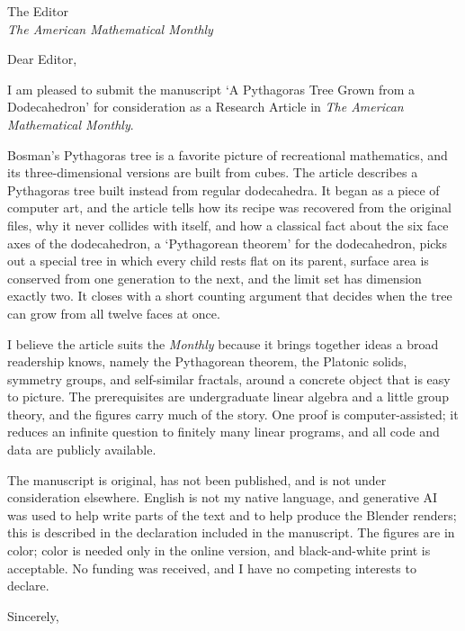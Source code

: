 \documentclass[11pt]{letter}
\date{\today}
\begin{document}
\begin{letter}{The Editor\\ \textit{The American Mathematical Monthly}}
\opening{Dear Editor,}

I am pleased to submit the manuscript `A Pythagoras Tree Grown from a
Dodecahedron' for consideration as a Research Article in \textit{The American
Mathematical Monthly}.

Bosman's Pythagoras tree is a favorite picture of recreational mathematics,
and its three-dimensional versions are built from cubes.  The article
describes a Pythagoras tree built instead from regular dodecahedra.  It began
as a piece of computer art, and the article tells how its recipe was recovered
from the original files, why it never collides with itself, and how a
classical fact about the six face axes of the dodecahedron, a `Pythagorean
theorem' for the dodecahedron, picks out a special tree in which every child
rests flat on its parent, surface area is conserved from one generation to
the next, and the limit set has dimension exactly two.  It closes with a
short counting argument that decides when the tree can grow from all twelve
faces at once.

I believe the article suits the \textit{Monthly} because it brings together
ideas a broad readership knows, namely the Pythagorean theorem, the Platonic
solids, symmetry groups, and self-similar fractals, around a concrete object
that is easy to picture.  The prerequisites are undergraduate linear algebra
and a little group theory, and the figures carry much of the story.  One
proof is computer-assisted; it reduces an infinite question to finitely many
linear programs, and all code and data are publicly available.

The manuscript is original, has not been published, and is not under
consideration elsewhere.  English is not my native language, and generative
AI was used to help write parts of the text and to help produce the Blender
renders; this is described in the declaration included in the manuscript.  The figures are in color; color
is needed only in the online version, and black-and-white print is
acceptable.  No funding was received, and I have no competing interests to
declare.

\closing{Sincerely,}
\end{letter}
\end{document}
